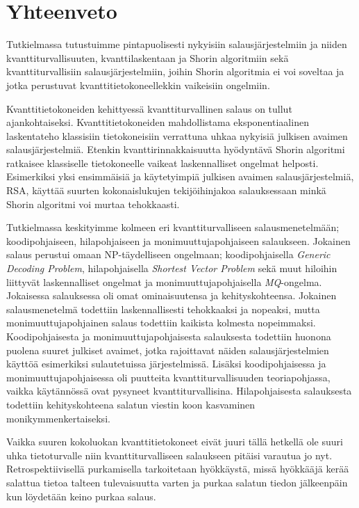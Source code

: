 \chapter{Yhteenveto\label{conclusions}}

Tutkielmassa tutustuimme pintapuolisesti nykyisiin salausjärjestelmiin ja niiden kvanttiturvallisuuten, kvanttilaskentaan ja Shorin algoritmiin sekä kvanttiturvallisiin salausjärjestelmiin, joihin Shorin algoritmia ei voi soveltaa ja jotka perustuvat kvanttitietokoneellekkin vaikeisiin ongelmiin.

Kvanttitietokoneiden kehittyessä kvanttiturvallinen salaus on tullut ajankohtaiseksi. Kvanttitietokoneiden mahdollistama eksponentiaalinen laskentateho klassisiin tietokoneisiin verrattuna uhkaa nykyisiä julkisen avaimen salausjärjestelmiä. Etenkin kvanttirinnakkaisuutta hyödyntävä Shorin algoritmi ratkaisee klassiselle tietokoneelle vaikeat laskennalliset ongelmat helposti. Esimerkiksi yksi ensimmäisiä ja käytetyimpiä julkisen avaimen salausjärjestelmiä, RSA, käyttää suurten kokonaislukujen tekijöihinjakoa salauksessaan minkä Shorin algoritmi voi murtaa tehokkaasti.

Tutkielmassa keskityimme kolmeen eri kvanttiturvalliseen salausmenetelmään; koodipohjaiseen, hilapohjaiseen ja monimuuttujapohjaiseen salaukseen. Jokainen salaus perustui omaan NP-täydelliseen ongelmaan; koodipohjaisella  \emph{Generic Decoding Problem}, hilapohjaisella \emph{Shortest Vector Problem} sekä muut hiloihin liittyvät laskennalliset ongelmat ja monimuuttujapohjaisella \emph{MQ}-ongelma. Jokaisessa salauksessa oli omat ominaisuutensa ja kehityskohteensa. Jokainen salausmenetelmä todettiin laskennallisesti tehokkaaksi ja nopeaksi, mutta monimuuttujapohjainen salaus todettiin kaikista kolmesta nopeimmaksi. Koodipohjaisesta ja monimuuttujapohjaisesta salauksesta todettiin huonona puolena suuret julkiset avaimet, jotka rajoittavat näiden salausjärjestelmien käyttöä esimerkiksi sulautetuissa järjestelmissä. Lisäksi koodipohjaisessa ja monimuuttujapohjaisessa oli puutteita kvanttiturvallisuuden teoriapohjassa, vaikka käytännössä ovat pysyneet kvanttiturvallisina. Hilapohjaisesta salauksesta todettiin kehityskohteena salatun viestin koon kasvaminen monikymmenkertaiseksi.

Vaikka suuren kokoluokan kvanttitietokoneet eivät juuri tällä hetkellä ole suuri uhka tietoturvalle niin kvanttiturvalliseen salaukseen pitäisi varautua jo nyt. Retrospektiivisellä purkamisella tarkoitetaan hyökkäystä, missä hyökkääjä kerää salattua tietoa talteen tulevaisuutta varten ja purkaa salatun tiedon jälkeenpäin kun löydetään keino purkaa salaus.